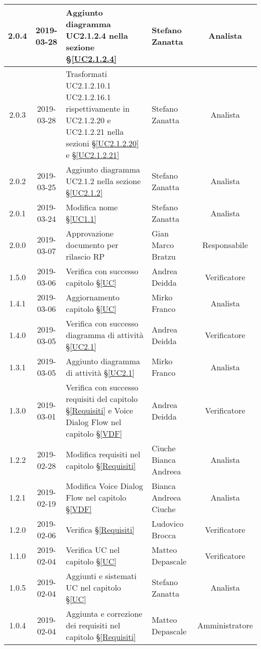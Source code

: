 \begin{center}
\begin{tabularx}{\textwidth}{|c|c|X|X|c|}
			\hline
			2.0.4 & 2019-03-28 & Aggiunto diagramma UC2.1.2.4 nella sezione \S\ref{UC2.1.2.4} & Stefano Zanatta & Analista \\
			\hline
			2.0.3 & 2019-03-28 & Trasformati UC2.1.2.10.1  UC2.1.2.16.1 rispettivamente in UC2.1.2.20 e UC2.1.2.21 nella sezioni \S\ref{UC2.1.2.20} e \S\ref{UC2.1.2.21}& Stefano Zanatta & Analista \\
			\hline
			2.0.2 & 2019-03-25 & Aggiunto diagramma UC2.1.2 nella sezione \S\ref{UC2.1.2} & Stefano Zanatta & Analista \\
			\hline
			2.0.1 & 2019-03-24 & Modifica nome \S\ref{UC1.1} & Stefano Zanatta & Analista \\
			\hline
			2.0.0 & 2019-03-07 & Approvazione documento per rilascio RP & Gian Marco Bratzu & Responsabile \\
			\hline
			1.5.0 & 2019-03-06 & Verifica con successo capitolo \S\ref{UC} &Andrea Deidda & Verificatore \\
			\hline
			1.4.1 & 2019-03-06 & Aggiornamento capitolo \S\ref{UC} & Mirko Franco & Analista \\
			\hline
			1.4.0 & 2019-03-05 & Verifica con successo diagramma di attività \S\ref{UC2.1} & Andrea Deidda & Verificatore \\
			\hline
			1.3.1 & 2019-03-05 & Aggiunto diagramma di attività \S\ref{UC2.1} & Mirko Franco & Analista \\
			\hline
			1.3.0 & 2019-03-01 & Verifica con successo requisiti del capitolo \S\ref{Requisiti} e Voice Dialog Flow nel capitolo \S\ref{VDF} & Andrea Deidda & Verificatore \\
			\hline
			1.2.2 & 2019-02-28 & Modifica requisiti nel capitolo \S\ref{Requisiti}& Ciuche Bianca Andreea & Analista \\
			\hline
			1.2.1 & 2019-02-19 & Modifica Voice Dialog Flow  nel capitolo \S\ref{VDF} & Bianca Andreea Ciuche & Analista  \\
			\hline
			1.2.0 & 2019-02-06 & Verifica \S\ref{Requisiti}& Ludovico Brocca & Verificatore \\
			\hline
			1.1.0 & 2019-02-04 & Verifica UC nel capitolo \S\ref{UC}& Matteo Depascale & Verificatore\\
			\hline
			1.0.5 & 2019-02-04 & Aggiunti e sistemati UC nel capitolo \S\ref{UC}& Stefano Zanatta & Analista\\
			\hline
			1.0.4 & 2019-02-04 & Aggiunta e correzione dei requisiti nel capitolo \S\ref{Requisiti}& Matteo Depascale & Amministratore\\

\end{tabularx}
\end{center}
